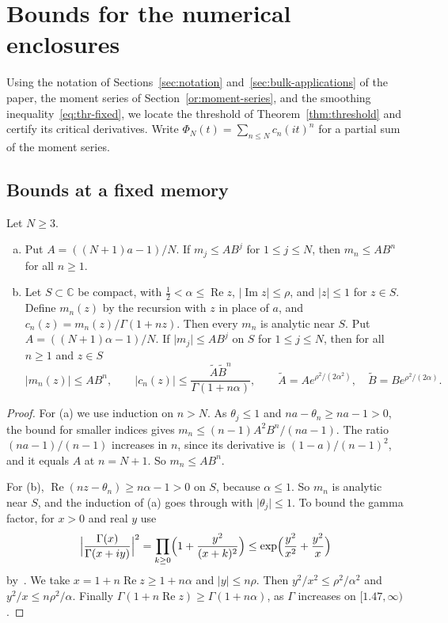 \section{Bounds for the numerical enclosures}\label{or:threshold}

Using the notation of Sections~\ref{sec:notation}
and~\ref{sec:bulk-applications} of the paper, the moment series of Section~\ref{or:moment-series}, and the smoothing
inequality~\eqref{eq:thr-fixed}, we locate the threshold of
Theorem~\ref{thm:threshold} and certify its critical derivatives.
Write $\Phi_N(t)=\sum_{n\le N}c_n(it)^n$ for a partial sum of the
moment series.

\subsection{Bounds at a fixed memory}

\begin{lemma}\label{lem:thr-moments}
Let $N\ge3$.
\begin{enumerate}[(a)]
\item Put $A=((N+1)a-1)/N$. If $m_j\le AB^j$ for $1\le j\le N$, then
$m_n\le AB^n$ for all $n\ge1$.
\item Let $S\subset\mathbb C$ be compact, with $\frac12<\alpha\le\operatorname{Re}z$,
$\lvert\operatorname{Im}z\rvert\le\rho$, and $\lvert z\rvert\le1$ for $z\in S$.
Define $m_n(z)$ by the recursion with $z$ in place of $a$, and
$c_n(z)=m_n(z)/\Gamma(1+nz)$. Then every $m_n$ is analytic near $S$. Put
$A=((N+1)\alpha-1)/N$. If $\lvert m_j\rvert\le AB^j$ on $S$ for $1\le j\le N$,
then for all $n\ge1$ and $z\in S$
\[
 \lvert m_n(z)\rvert\le AB^n,\qquad
 \lvert c_n(z)\rvert\le\frac{\tilde A\tilde B^n}{\Gamma(1+n\alpha)},\qquad
 \tilde A=Ae^{\rho^2/(2\alpha^2)},\quad \tilde B=Be^{\rho^2/(2\alpha)} .
\]
\end{enumerate}
\end{lemma}

\begin{proof}
For (a) we use induction on $n>N$. As $\theta_j\le1$ and
$na-\theta_n\ge na-1>0$, the bound for smaller indices gives
$m_n\le(n-1)A^2B^n/(na-1)$. The ratio $(na-1)/(n-1)$ increases in $n$, since
its derivative is $(1-a)/(n-1)^2$, and it equals $A$ at $n=N+1$. So
$m_n\le AB^n$.

For (b), $\operatorname{Re}(nz-\theta_n)\ge n\alpha-1>0$ on $S$, because
$\alpha\le1$. So $m_n$ is analytic near $S$, and the induction of (a) goes
through with $\lvert\theta_j\rvert\le1$. To bound the gamma factor, for $x>0$ and real $y$ use
\[
 \Bigl\lvert\frac{\Gamma(x)}{\Gamma(x+iy)}\Bigr\rvert^2
 =\prod_{k\ge0}\Bigl(1+\frac{y^2}{(x+k)^2}\Bigr)
 \le\exp\Bigl(\frac{y^2}{x^2}+\frac{y^2}x\Bigr)
\]
by~\cite[5.8.3]{dlmf}. We take $x=1+n\operatorname{Re}z\ge1+n\alpha$ and
$\lvert y\rvert\le n\rho$. Then $y^2/x^2\le\rho^2/\alpha^2$ and
$y^2/x\le n\rho^2/\alpha$. Finally
$\Gamma(1+n\operatorname{Re}z)\ge\Gamma(1+n\alpha)$, as $\Gamma$ increases on
$[1.47,\infty)$.
\end{proof}

